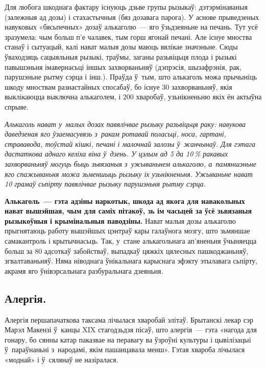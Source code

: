 
Для любога шкоднага фактару існуюць дзьве групы рызыкаў: дэтэрмінаваныя (залежныя ад дозы) і стахастычныя (бяз дозавага парога). У аснове прыведзеных навуковых «бясьпечных» дозаў алькаголю~--- яго ўзьдзеяньне на печань. Тут усё зразумела: чым больш п'е чалавек, тым горш ягонай печані. Але існуе мноства станаў і сытуацый, калі нават малыя дозы маюць вялікае значэньне. Сюды ўваходзяць сацыяльныя рызыкі, траўмы, заганы разьвіцьця плода і рызыкі павышэньня імавернасьці іншых захворваньняў (дэпрэсія, шызафрэнія, рак, парушэньне рытму сэрца і інш.). Праўда ў~тым, што алькаголь можа прычыніць шкоду мноствам разнастайных спосабаў, бо існуе 30 захворваньняў, якія выклікаюцца выключна алькаголем, і 200 хваробаў, узьнікненьню якіх ён актыўна спрыяе.

\emph{Алькаголь нават у~малых дозах павялічвае рызыку разьвіцьця раку: навукова даведзеная яго ўзаемасувязь з~ракам ротавай поласьці, носа, гартані, стрававода, тоўстай кішкі, печані і малочнай залозы ў~жанчынаў. Для гэтага дастаткова аднаго келіха віна ў~дзень. У цэлым ад 5 да 10\,\% ракавых захворваньняў могуць быць зьвязаныя з~ужываньнем алькаголю, а~памяншэньне яго спажываньня можа зьменшыць рызыку іх узьнікненьня. Ужываньне нават 10 грамаў сьпірту павялічвае рызыку парушэньня рытму сэрца.}

\textbf{Алькаголь~--- гэта адзіны наркотык, шкода ад якога для навакольных нават вышэйшая, чым для саміх пітакоў, зь ім часьцей за ўсё зьвязаныя рызыкоўныя і крымінальныя паводзіны.} Нават малыя дозы алькаголю прыгнятаюць работу вышэйшых цэнтраў кары галаўнога мозгу, што зьмяншае самакантроль і крытычнасьць. Так, у~стане алькагольнага ап'яненьня ўчыняецца больш за 80 адсоткаў забойстваў, выпадкаў цяжкіх цялесных пашкоджаньняў, згвалтаваньняў. Няма ніводнага ўнікальнага карыснага эфэкту этылавага сьпірту, акрамя яго ўнівэрсальнага разбуральнага дзеяньня.

\subsection*{Алергія.}

Алергія першапачаткова таксама лічылася хваробай элітаў. Брытанскі лекар сэр Марэл Макензі ў~канцы XIX стагодзьдзя пісаў, што алергія~--- гэта «нагода для гонару, бо сянны катар паказвае на перавагу ва ўзроўні культуры і цывілізацыі ў~параўнаньні з~народамі, якім пашанцавала менш». Гэтая хвароба лічылася «моднай» і ў~сялянаў не назіралася.

